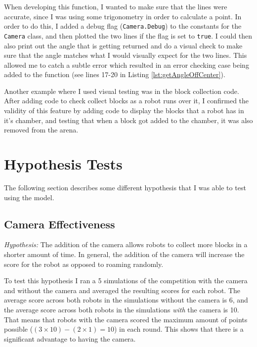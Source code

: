 \documentclass[12pt]{article}
\begin{document}
When developing this function, I wanted to make sure that the lines were accurate, since I was using some trigonometry in order to calculate a point. In order to do this, I added a debug flag (\texttt{Camera.Debug}) to the constants for the \texttt{Camera} class, and then plotted the two lines if the flag is set to \texttt{true}. I could then also print out the angle that is getting returned and do a visual check to make sure that the  angle matches what I would visually expect for the two lines. This allowed me to catch a subtle error which resulted in an error checking case being added to the function (see lines 17-20 in Listing \ref{lst:getAngleOffCenter}).

Another example where I used visual testing was in the block collection code. After adding code to check collect blocks as a robot runs over it, I confirmed the validity of this feature by adding code to display the blocks that a robot has in it's chamber, and testing that when a block got added to the chamber, it was also removed from the arena.

\section{Hypothesis Tests}
The following section describes some different hypothesis that I was able to test using the model. 

\subsection{Camera Effectiveness}
\textit{Hypothesis:} The addition of the camera allows robots to collect more blocks in a shorter amount of time. In general, the addition of the camera will increase the score for the robot as opposed to roaming randomly.

To test this hypothesis I ran a 5 simulations of the competition with the camera and without the camera and averaged the resulting scores for each robot. The average score across both robots in the simulations without the camera is 6, and the average score across both robots in the simulations \textit{with} the camera is 10. That means that robots with the camera scored the maximum amount of points possible ($(3 \times 10) - (2 \times 1) = 10$) in each round. This shows that there is a significant advantage to having the camera. 
\end{document}
